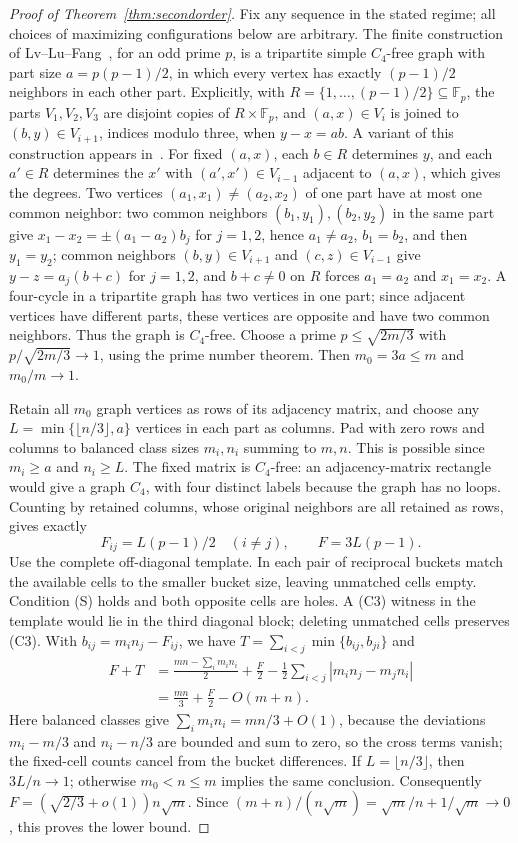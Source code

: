 \documentclass[11pt]{article}
\begin{document}
\begin{proof}[Proof of Theorem~\ref{thm:secondorder}]
Fix any sequence in the stated regime; all choices of maximizing
configurations below are arbitrary. The finite construction of Lv--Lu--Fang~\cite[Theorem 4]{llf}, for an
odd prime $p$, is a tripartite simple $C_4$-free graph with part size
$a=p(p-1)/2$, in which every vertex has exactly $(p-1)/2$ neighbors
in each other part. Explicitly, with
$R=\{1,\ldots,(p-1)/2\}\subseteq\mathbb F_p$, the parts $V_1,V_2,V_3$ are disjoint copies of $R\times\mathbb F_p$,
and $(a,x)\in V_i$ is joined to
$(b,y)\in V_{i+1}$, indices modulo three, when $y-x=ab$. A variant of this construction
appears in~\cite[Section~2]{llf2}. For fixed $(a,x)$, each $b\in R$ determines
$y$, and each $a'\in R$ determines the $x'$ with $(a',x')\in V_{i-1}$
adjacent to $(a,x)$, which gives the degrees. Two vertices
$(a_1,x_1)\ne(a_2,x_2)$ of one part have at most one common neighbor: two
common neighbors $(b_1,y_1),(b_2,y_2)$ in the same part give
$x_1-x_2=\pm(a_1-a_2)b_j$ for $j=1,2$, hence $a_1\ne a_2$, $b_1=b_2$, and
then $y_1=y_2$; common neighbors $(b,y)\in V_{i+1}$ and $(c,z)\in V_{i-1}$
give $y-z=a_j(b+c)$ for $j=1,2$, and $b+c\ne0$ on $R$ forces $a_1=a_2$ and
$x_1=x_2$. A four-cycle in a tripartite graph has two vertices in one part; since
adjacent vertices have different parts, these vertices are opposite and
have two common neighbors. Thus the graph is $C_4$-free.
Choose a prime $p\le\sqrt{2m/3}$ with
$p/\sqrt{2m/3}\to1$, using the prime number theorem. Then
$m_0=3a\le m$ and $m_0/m\to1$.

Retain all $m_0$ graph vertices as rows of its adjacency matrix, and
choose any $L=\min\{\lfloor n/3\rfloor,a\}$ vertices in each part
as columns. Pad with zero rows and columns to balanced class sizes
$m_i,n_i$ summing to $m,n$. This is possible since $m_i\ge a$ and
$n_i\ge L$. The fixed matrix is $C_4$-free: an adjacency-matrix
rectangle would give a graph $C_4$, with four distinct labels because
the graph has no loops. Counting by retained columns, whose original
neighbors are all retained as rows, gives exactly
\[
 F_{ij}=L(p-1)/2\quad(i\ne j),\qquad F=3L(p-1).
\]
Use the complete off-diagonal template. In each pair of reciprocal
buckets match the available cells to the smaller bucket size, leaving
unmatched cells empty. Condition \textup{(S)} holds and both opposite
cells are holes. A \textup{(C3)} witness in the template would lie in the
third diagonal block; deleting unmatched cells preserves \textup{(C3)}.
With $b_{ij}=m_i n_j-F_{ij}$,
we have $T=\sum_{i<j}\min\{b_{ij},b_{ji}\}$ and
\[
 \begin{split}
 F+T
 &=\frac{mn-\sum_i m_i n_i}{2}+\frac F2
       -\frac12\sum_{i<j}|m_i n_j-m_j n_i|\\
 &=\frac{mn}{3}+\frac F2-O(m+n).
 \end{split}
\]
Here balanced classes give $\sum_i m_i n_i=mn/3+O(1)$, because the
deviations $m_i-m/3$ and $n_i-n/3$ are bounded and sum to zero, so the
cross terms vanish; the fixed-cell counts cancel from the bucket
differences. If
$L=\lfloor n/3\rfloor$, then $3L/n\to1$; otherwise
$m_0<n\le m$ implies the same conclusion. Consequently
$F=(\sqrt{2/3}+o(1))n\sqrt m$. Since
$(m+n)/(n\sqrt m)=\sqrt m/n+1/\sqrt m\to0$, this proves the lower bound.


\end{proof}
\end{document}
